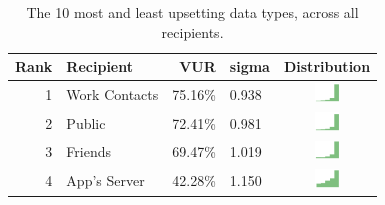 \begin{table}[t]
\begin{center}
\small
\begin{tabular}{| r | l | r | l |c |}
\hline
Rank & Recipient & VUR & sigma & Distribution \\
\hline
1 & Work Contacts & 75.16\% & 0.938 & \includegraphics[width = 2cm, height = 0.5cm]{tex-inputs/recipient4/recipient_work} \\
2 & Public & 72.41\% & 0.981 & \includegraphics[width = 2cm, height = 0.5cm]{tex-inputs/recipient4/recipient_pub}  \\
3 & Friends & 69.47\% & 1.019 & \includegraphics[width = 2cm, height = 0.5cm]{tex-inputs/recipient4/recipient_friends}\\
4 & App's Server & 42.28\% & 1.150 & \includegraphics[width = 2cm, height = 0.5cm]{tex-inputs/recipient4/recipient_app}\\
\hline
\end{tabular}
\caption{The 10 most and least upsetting data types, across all recipients.}
\label{recipient-table}
\end{center}
\end{table}

